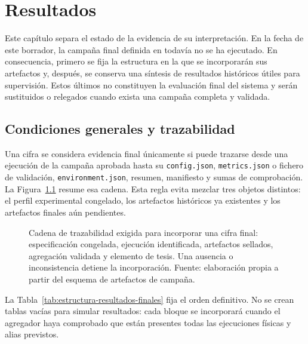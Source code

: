\chapter{Resultados}

Este capítulo separa el estado de la evidencia de su interpretación. En la fecha de este borrador, la campaña final definida en  todavía no se ha ejecutado. En consecuencia, primero se fija la estructura en la que se incorporarán sus artefactos y, después, se conserva una síntesis de resultados históricos útiles para supervisión. Estos últimos no constituyen la evaluación final del sistema y serán sustituidos o relegados cuando exista una campaña completa y validada.

\section{Condiciones generales y trazabilidad}
\label{sec:resultados-condiciones}

Una cifra se considera evidencia final únicamente si puede trazarse desde una ejecución de la campaña aprobada hasta su \texttt{config.json}, \texttt{metrics.json} o fichero de validación, \texttt{environment.json}, resumen, manifiesto y sumas de comprobación. La Figura~\ref{fig:trazabilidad-evidencia} resume esa cadena. Esta regla evita mezclar tres objetos distintos: el perfil experimental congelado, los artefactos históricos ya existentes y los artefactos finales aún pendientes.

\begin{figure}[htbp]
\centering
\resizebox{0.98\textwidth}{!}{}
\caption[Trazabilidad desde el diseño hasta la tesis]{Cadena de trazabilidad exigida para incorporar una cifra final: especificación congelada, ejecución identificada, artefactos sellados, agregación validada y elemento de tesis. Una ausencia o inconsistencia detiene la incorporación. Fuente: elaboración propia a partir del esquema de artefactos de campaña.}
\label{fig:trazabilidad-evidencia}
\end{figure}

La Tabla~\ref{tab:estructura-resultados-finales} fija el orden definitivo. No se crean tablas vacías para simular resultados: cada bloque se incorporará cuando el agregador haya comprobado que están presentes todas las ejecuciones físicas y alias previstos.


